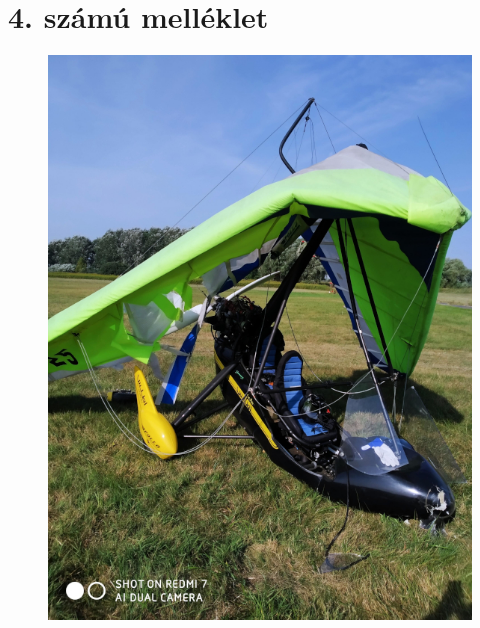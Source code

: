 \documentclass[a4paper,10pt]{article}
\begin{document}
\section*{4. számú melléklet}
\begin{figure}[ht!]
\centering
\includegraphics[width=13cm]{kepek/CR1}
\end{figure}
\end{document}
